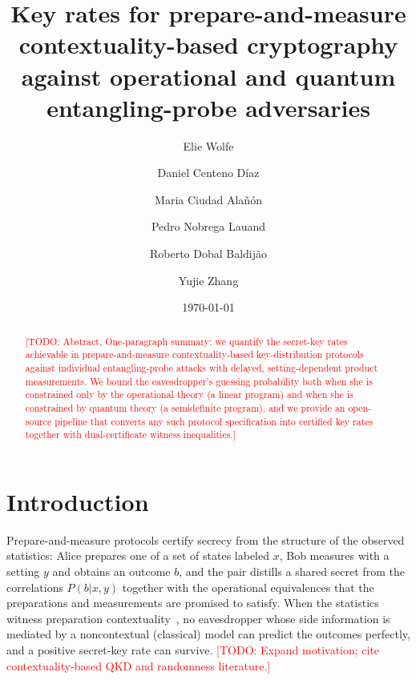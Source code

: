 \documentclass[aps,pra,twocolumn,superscriptaddress,longbibliography,nofootinbib]{revtex4-2}
\newcommand{\todo}[1]{\textcolor{red}{[TODO: #1]}}
\begin{document}
\title{Key rates for prepare-and-measure contextuality-based cryptography against operational and quantum entangling-probe adversaries}

\author{Elie Wolfe}

\author{Daniel Centeno D\'iaz}
\affiliation{\todo{affiliation}}

\author{Maria Ciudad Ala\~n\'on}
\affiliation{\todo{affiliation}}

\author{Pedro Nobrega Lauand}
\affiliation{\todo{affiliation}}

\author{Roberto Dobal Baldij\~ao}
\affiliation{\todo{affiliation}}

\author{Yujie Zhang}
\affiliation{\todo{affiliation}}

\date{\today}

\begin{abstract}
\todo{Abstract. One-paragraph summary: we quantify the secret-key rates achievable in prepare-and-measure contextuality-based key-distribution protocols against individual entangling-probe attacks with delayed, setting-dependent product measurements. We bound the eavesdropper's guessing probability both when she is constrained only by the operational theory (a linear program) and when she is constrained by quantum theory (a semidefinite program), and we provide an open-source pipeline that converts any such protocol specification into certified key rates together with dual-certificate witness inequalities.}
\end{abstract}

\maketitle

\section{Introduction}
\label{sec:intro}

Prepare-and-measure protocols certify secrecy from the structure of the
observed statistics: Alice prepares one of a set of states labeled
$x$, Bob measures with a setting $y$ and obtains an outcome $b$, and the
pair distills a shared secret from the correlations $P(b|x,y)$ together
with the operational equivalences that the preparations and measurements
are promised to satisfy. When the statistics witness preparation
contextuality~\cite{Spekkens2005}, no eavesdropper whose side information
is mediated by a noncontextual (classical) model can predict the
outcomes perfectly, and a positive secret-key rate can survive.
\todo{Expand motivation; cite contextuality-based QKD and randomness
literature.}
\end{document}
